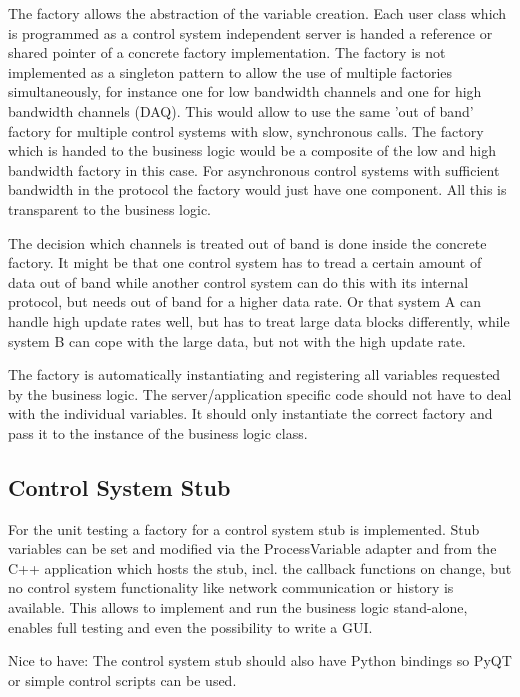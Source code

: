 \documentclass[11pt,a4paper]{scrartcl}
\begin{document}
The factory allows the abstraction of the variable creation. Each user class
which is programmed as a control system independent server is handed a
reference or shared pointer of a concrete factory implementation. The factory
is not implemented as a singleton pattern to allow the use of multiple
factories simultaneously, for instance one for low bandwidth channels and one
for high bandwidth channels (DAQ). This would allow to use the same 'out of
band' factory for multiple control systems with slow, synchronous calls. The
factory which is handed to the business logic would be a composite of the low
and high bandwidth factory in this case. 
For asynchronous control systems with sufficient bandwidth in the protocol the
factory would just have one component. All this is transparent to the business
logic.

The decision which channels is treated out of band is done inside the concrete
factory. It might be that one control system has to tread a certain amount of
data out of band while another control system can do this with its internal
protocol, but needs out of band for a higher data rate. Or that system A can
handle high update rates well, but has to treat large data blocks differently,
while system B can cope with the large data, but not with the high update
rate.

The factory is automatically instantiating and registering all variables
requested by the business logic. The server/application specific code should
not have to deal with the individual variables. It should only instantiate the
correct factory and pass it to the instance of the business logic class.

\subsection{Control System Stub}
For the unit testing a factory for a control system stub is implemented.
Stub variables can be set and modified via the ProcessVariable adapter and from
the C++ application which hosts the stub, incl. the callback functions on
change, but no control system functionality like network communication or
history is available. This allows to implement and run the business logic
stand-alone, enables full testing and even the possibility to write a GUI.

Nice to have: The control system stub should also have Python bindings so PyQT
or simple control scripts can be used.
\end{document}
